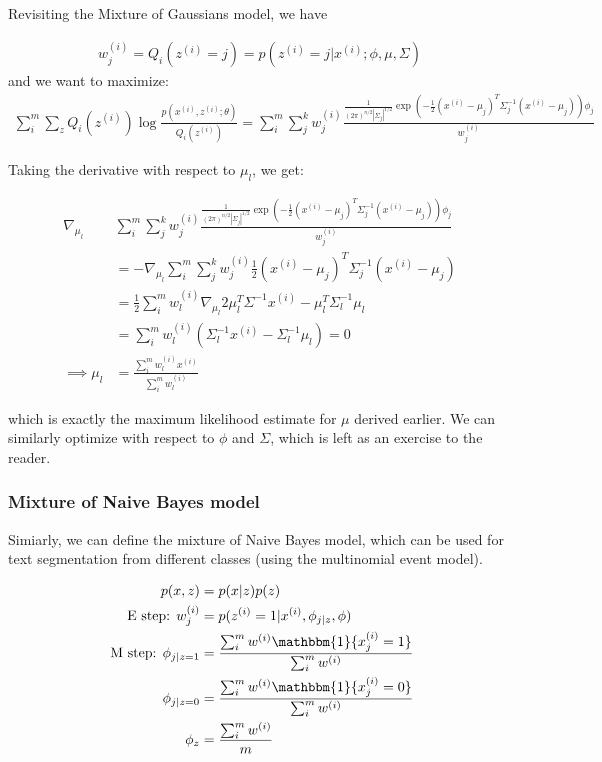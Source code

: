 \documentclass[letterpaper,10pt]{article}
\begin{document}
Revisiting the Mixture of Gaussians model, we have

\begin{align}
w_j^{(i)} = Q_i(z^{(i)} = j) = p(z^{(i)} = j | x^{(i)}; \phi, \mu, \Sigma) 
\end{align}
and we want to maximize:
\begin{align}
\sum_i^m \sum_z Q_i(z^{(i)}) \log \frac{p(x^{(i)}, z^{(i)}; \theta)}{Q_i(z^{(i)})} = \sum_i^m \sum_j^k w_j^{(i)} \frac{\frac{1}{(2\pi)^{n/2}|\Sigma_j|^{1/2}} \exp(-\frac{1}{2}(x^{(i)} - \mu_j)^T \Sigma_j^{-1}(x^{(i)}-\mu_j)) \phi_j}{w_j^{(i)}}
\end{align}

Taking the derivative with respect to $\mu_l$, we get:

\begin{align}
\nabla_{\mu_l} &\sum_i^m \sum_j^k w_j^{(i)} \frac{\frac{1}{(2\pi)^{n/2}|\Sigma_j|^{1/2}} \exp(-\frac{1}{2}(x^{(i)} - \mu_j)^T \Sigma_j^{-1}(x^{(i)}-\mu_j)) \phi_j}{w_j^{(i)}} \\
&= - \nabla_{\mu_l} \sum_i^m \sum_j^k  w_j^{(i)} \frac{1}{2}(x^{(i)} - \mu_j)^T \Sigma_j^{-1}(x^{(i)}-\mu_j) \\
&= \frac{1}{2} \sum_i^m w_l^{(i)} \nabla_{\mu_l} 2\mu_l^T \Sigma^{-1} x^{(i)} - \mu_l^T \Sigma_l^{-1} \mu_l \\
&= \sum_i^m w_l^{(i)} (\Sigma_l^{-1} x^{(i)} - \Sigma_l^{-1} \mu_l) = 0 \\
\implies \mu_l &= \frac{\sum_i^m w_l^{(i)} x^{(i)}}{\sum_i^m w_l^{(i)}}
\end{align}

which is exactly the maximum likelihood estimate for $\mu$ derived earlier. We can similarly optimize with respect to $\phi$ and $\Sigma$, which is left as an exercise to the reader.


\subsubsection{Mixture of Naive Bayes model}

Simiarly, we can define the mixture of Naive Bayes model, which can be used for text segmentation from different classes (using the multinomial event model).

\begin{align}
p(x,z) &= p(x|z) p(z) \\
\text{ E step: } w_j^{(i)} &= p(z^{(i)} = 1 | x^{(i)}, \phi_{j|z}, \phi) \\
\text{ M step: } \phi_{j|z=1} &= \frac{\sum_i^m w^{(i)} \mathbbm{1} \{x_j^{(i)} = 1\}}{ \sum_i^m w^{(i)}} \\
\phi_{j|z=0} &= \frac{\sum_i^m w^{(i)} \mathbbm{1} \{x_j^{(i)} = 0\}}{ \sum_i^m w^{(i)}} \\
\phi_z &= \frac{\sum_i^m w^{(i)}}{m} 
\end{align}
\end{document}
